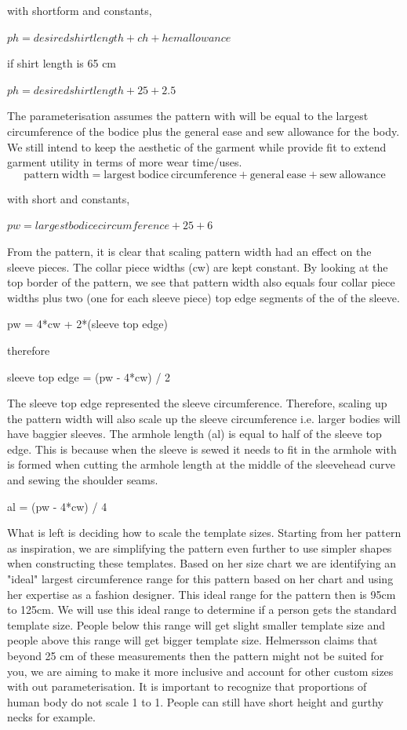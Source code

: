 with shortform and constants,

$ph = desired shirt length + ch + hem allowance$

if shirt length is 65 cm 

$ph = desired shirt length + 25 + 2.5$

The parameterisation assumes the pattern with will be equal to the largest circumference of the bodice plus the general ease and sew allowance for the body. We still intend to keep the aesthetic of the garment while provide fit to extend garment utility in terms of more wear time/uses.
\begin{equation}
    \mathrm{pattern\ width} = \mathrm{largest\ bodice\ circumference} + \mathrm{general\ ease} + \mathrm{sew\ allowance}
    \label{eq:pattern width}
\end{equation}

with short and constants,

$pw = largest bodice circumference + 25 + 6$

From the pattern, it is clear that scaling pattern width had an effect on the sleeve pieces. The collar piece widths (cw) are kept constant. By looking at the top border of the pattern, we see that pattern width also equals four collar piece widths plus two (one for each sleeve piece) top edge segments of the of the sleeve.

pw = 4*cw + 2*(sleeve top edge)

therefore

sleeve top edge = (pw - 4*cw) / 2

The sleeve top edge represented the sleeve circumference. Therefore, scaling up the pattern width will also scale up the sleeve circumference i.e. larger bodies will have baggier sleeves.
The armhole length (al) is equal to half of the sleeve top edge. This is because when the sleeve is sewed it needs to fit in the armhole with is formed when cutting the armhole length at the middle of the sleevehead curve and sewing the shoulder seams.

al = (pw - 4*cw) / 4

What is left is deciding how to scale the template sizes. Starting from her pattern as inspiration, we are simplifying the pattern even further to use simpler shapes when constructing these templates. Based on her size chart we are identifying an "ideal" largest circumference range for this pattern based on her chart and using her expertise as a fashion designer. This ideal range for the pattern then is 95cm to 125cm. We will use this ideal range to determine if a person gets the standard template size. People below this range will get slight smaller template size and people above this range will get bigger template size. Helmersson claims that beyond 25 cm of these measurements then the pattern might not be suited for you, we are aiming to make it more inclusive and account for other custom sizes with out parameterisation. It is important to recognize that proportions of human body do not scale 1 to 1. People can still have short height and gurthy necks for example.

